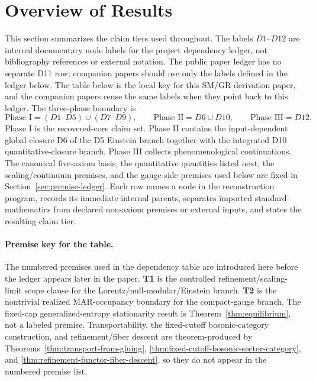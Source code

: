 \documentclass[11pt]{article}
\begin{document}
\section{Overview of Results}

This section summarizes the claim tiers used throughout. The labels \(D1\)--\(D12\) are internal
documentary node labels for the project dependency ledger, not bibliography references or external
notation. The public paper ledger has no separate D11 row; companion papers should use
only the labels defined in the ledger below. The table below is the local key for this
SM/GR derivation paper, and the companion papers reuse the same labels when they point back to this ledger. The
three-phase boundary is
\[
\text{Phase I}=(D1\text{--}D5)\cup(D7\text{--}D9),\qquad
\text{Phase II}=D6\cup D10,\qquad
\text{Phase III}=D12.
\]
Phase I is the recovered-core claim set. Phase II contains the input-dependent global closure D6 of the D5 Einstein branch together with the integrated D10 quantitative-closure branch. Phase III collects phenomenological continuations. The canonical five-axiom basis, the quantitative quantities listed next, the scaling/continuum premises, and the gauge-side premises used below are fixed in Section~\ref{sec:premise-ledger}. Each row names a node in the reconstruction program, records its immediate internal parents, separates imported standard mathematics from declared non-axiom premises or external inputs, and states the resulting claim tier.

\paragraph{Premise key for the table.}
The numbered premises used in the dependency table are introduced here before the ledger appears later in the paper. \textbf{T1} is the controlled refinement/scaling-limit scope clause for the Lorentz/null-modular/Einstein branch. \textbf{T2} is the nontrivial realized MAR-occupancy boundary for the compact-gauge branch. The fixed-cap generalized-entropy stationarity result is Theorem~\ref{thm:equilibrium}, not a labeled premise. Transportability, the fixed-cutoff bosonic-category construction, and refinement/fiber descent are theorem-produced by Theorems~\ref{thm:transport-from-gluing}, \ref{thm:fixed-cutoff-bosonic-sector-category}, and \ref{thm:refinement-functor-fiber-descent}, so they do not appear in the numbered premise list.
\end{document}
